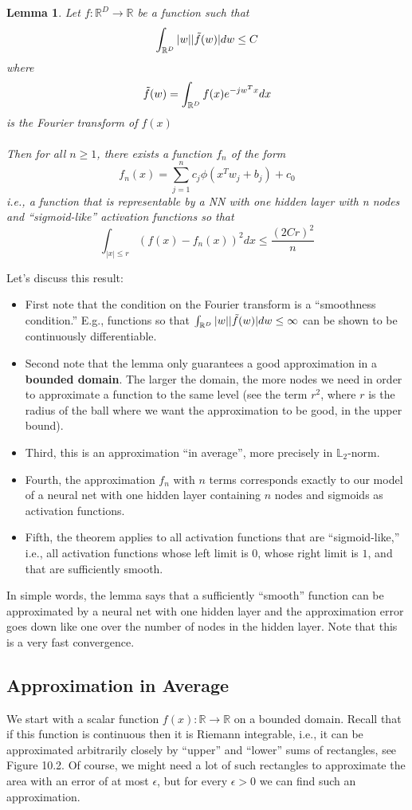 \documentclass[twoside]{article}
\newtheorem{lemma}[theorem]{Lemma}
\begin{document}
\begin{lemma}
Let $f: \mathbb{R}^{D} \rightarrow \mathbb{R}$ be a function such that $$\int_{\mathbb{R}^{D}} |w||\Tilde{f}(w)|dw \leq C$$
where 
$$\Tilde{f}(w) = \int_{\mathbb{R}^{D}} f(x) e^{-jw^T x}dx$$
is the Fourier transform of $f(x)$\\
\\Then for all $n \geq 1 $, there exists a function $f_{n}$ of the form
$$f_{n}(x) = \sum_{j=1}^{n}c_{j}\phi(x^T w_{j} + b_{j}) + c_{0}$$
i.e., a function that is representable by a NN with one
hidden layer with n nodes and “sigmoid-like” activation
functions so that
$$\int_{|x| \leq r}(f(x) - f_{n}(x))^2dx \leq \dfrac{(2Cr)^2}{n}$$
\end{lemma}
Let's discuss this result:
\begin{itemize}
    \item First note that the condition on the Fourier
transform is a “smoothness condition.” E.g., functions so
that $\int_{\mathbb{R}^{D}} |w||\Tilde{f}(w)|dw \leq \infty$ can be shown to be continuously
differentiable.
\item Second note that the lemma only guarantees a good approximation in a \textbf{bounded domain}. The larger the domain, the more nodes we need in order to approximate a function to the same level (see the term $r^2$, where $r$ is the radius of the ball where we want the approximation to be good, in the upper bound).
\item Third, this is an approximation “in average”, more precisely in $\mathbb{L}_{2}$-norm. 
\item Fourth, the approximation $f_{n}$ with $n$ terms corresponds exactly to our model of a neural net with one hidden layer containing $n$ nodes and sigmoids as activation functions.
\item Fifth, the theorem applies to all activation functions that are
“sigmoid-like,” i.e., all activation functions whose left limit
is $0$, whose right limit is $1$, and that are sufficiently smooth.
\end{itemize}
In simple words, the lemma says that a sufficiently “smooth” function can be approximated by a neural net with one hidden
layer and the approximation error goes down like one over
the number of nodes in the hidden layer. Note that this is a
very fast convergence.
\subsection{Approximation in Average}
We start with a scalar function $f(x): \mathbb{R} \rightarrow \mathbb{R}$ on a bounded domain. Recall that if this function is continuous then it is Riemann integrable, i.e., it can be approximated arbitrarily closely
by “upper” and “lower” sums of rectangles, see Figure 10.2. Of course, we might need a lot of such rectangles to approximate
the area with an error of at most $\epsilon$, but for every $\epsilon > 0$ we
can find such an approximation. 
\end{document}
